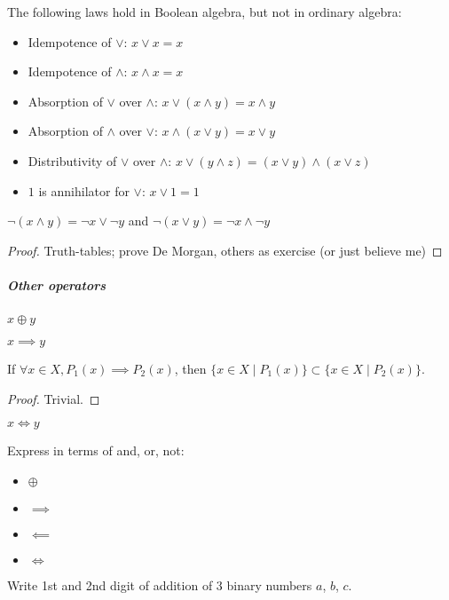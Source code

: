 \begin{property}
    The following laws hold in Boolean algebra, but not in ordinary algebra: 
    \begin{itemize}
        \item Idempotence of $\lor$: $x \lor x = x$
        \item Idempotence of $\land$: $x \land x = x$
        \item Absorption of $\lor$ over $\land$: $x \lor (x \land y)  = x \land y$
        \item Absorption of $\land$ over $\lor$: $x \land (x \lor y)  = x \lor y$
        \item Distributivity of $\lor$ over $\land$:  $x \lor (y \land z) = (x \lor y) \land (x \lor z)$
        \item $1$ is annihilator for $\lor$: $x \lor 1 = 1$
    \end{itemize}
\end{property}
\begin{property}
    $\lnot (x \land y) = \lnot x \lor \lnot y$
    and
    $\lnot (x \lor y) = \lnot x \land \lnot y$
\end{property}
\begin{proof}
    Truth-tables; prove De Morgan, others as exercise (or just believe me)
\end{proof}

\subparagraph{Other operators}
\begin{definition}[Exclusive Or]
    $x \oplus y$
\end{definition}
\begin{definition}[Implication]
    $x \implies y$
\end{definition}
\begin{property}
    If $\forall x \in X, P_1(x) \implies P_2(x)$, then $\{ x \in X \mid P_1(x) \} \subset \{ x \in X \mid P_2(x) \}$.
\end{property}
\begin{proof}
    Trivial.
\end{proof}
\begin{definition}
    $x \iff y$
\end{definition}
\begin{question}
    Express in terms of and, or, not:
    \begin{itemize}
        \item $\oplus$
        \item $\implies$
        \item $\impliedby$
        \item $\iff$
    \end{itemize}
    Write 1st and 2nd digit of addition of 3 binary numbers $a$, $b$, $c$.
\end{question}

